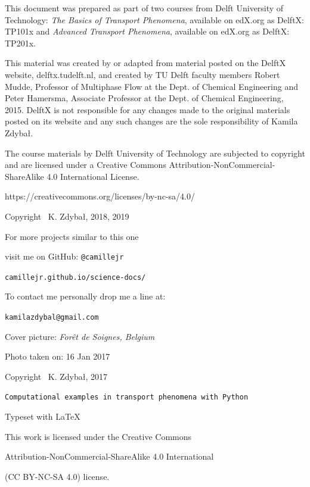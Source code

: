 \documentclass[10pt]{article}
\begin{document}
\thispagestyle{empty}
\begin{center}

This document was prepared as part of two courses from Delft University of Technology: \textit{The Basics of Transport Phenomena}, available on edX.org as DelftX: TP101x and \textit{Advanced Transport Phenomena}, available on edX.org as DelftX: TP201x.

This material was created by or adapted from material posted on the DelftX website, delftx.tudelft.nl, and created by TU Delft faculty members Robert Mudde, Professor of Multiphase Flow at the Dept. of Chemical Engineering and Peter Hamersma, Associate Professor at the Dept. of Chemical Engineering, 2015. DelftX is not responsible for any changes made to the original materials posted on its website and any such changes are the sole responsibility of Kamila Zdybał.

The course materials by Delft University of Technology are subjected to copyright and are licensed under a Creative Commons Attribution-NonCommercial-ShareAlike 4.0 International License.

https://creativecommons.org/licenses/by-nc-sa/4.0/

\vspace*{6cm}


\setlength{\parskip}{0.0em}
\setlength{\parindent}{0cm}

Copyright \textcopyright \, K. Zdybał, 2018, 2019

For more projects similar to this one

visit me on GitHub: \verb|@camillejr|

\verb|camillejr.github.io/science-docs/|

To contact me personally drop me a line at:

\verb|kamilazdybal@gmail.com|

\vspace*{1cm}

Cover picture: \textit{Forêt de Soignes, Belgium}

Photo taken on: 16 Jan 2017

Copyright \textcopyright \, K. Zdybał, 2017

\vspace*{6cm}

\verb|Computational examples in transport phenomena with Python|

Typeset with \LaTeX

\vspace*{2cm}

\noindent This work is licensed under the Creative Commons

Attribution-NonCommercial-ShareAlike 4.0 International 

(CC BY-NC-SA
4.0) license.

\end{center}
\setlength{\parskip}{0.6em}
\setlength{\parindent}{0.5cm}
\end{document}
